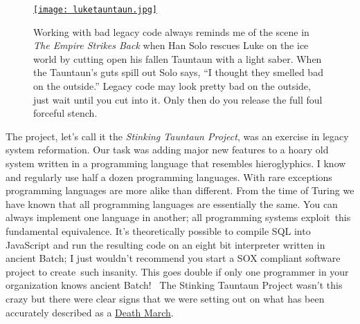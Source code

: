 \captionsetup[figure]{labelformat=empty}
\begin{SCfigure}[20]
\centering
\href{http://starwars.wikia.com/wiki/Tauntaun}{\texttt{[image: luketauntaun.jpg]}}
\caption[Working with bad legacy code always reminds me of the scene in \emph{The
Empire Strikes Back} when Han Solo rescues Luke on the ice world]{Working with bad legacy code always reminds me of the scene in \emph{The
Empire Strikes Back} when Han Solo rescues Luke on the ice world by
cutting open his fallen Tauntaun with a light saber. When the Tauntaun's
guts spill out Solo says, ``I thought they smelled bad on the outside.''
Legacy code may look pretty bad on the outside, just wait until you cut
into it. Only then do you release the full foul forceful
stench.}
\label{fig:4971X0}
\end{SCfigure}


The project, let's call it the \emph{Stinking Tauntaun Project}, was an
exercise in legacy system reformation. Our task was adding major new
features to a hoary old system written in a programming language that
resembles hieroglyphics. I know and regularly use half a dozen
programming languages. With rare exceptions programming languages are
more alike than different. From the time of Turing we have known that
all programming languages are essentially the same. You can always
implement one language in another; all programming systems exploit~this
fundamental equivalence. It's theoretically possible to compile SQL into
JavaScript and run the resulting code on an eight bit interpreter
written in ancient Batch; I just wouldn't recommend you start a SOX
compliant software project to create~such insanity. This goes double if
only one programmer in your organization knows ancient Batch! ~The
Stinking Tauntaun Project wasn't this crazy but there were clear signs
that we were setting out on what has been accurately described as a
\href{http://www.amazon.com/Death-March-Edition-Edward-Yourdon/dp/013143635X}{Death
March}.

